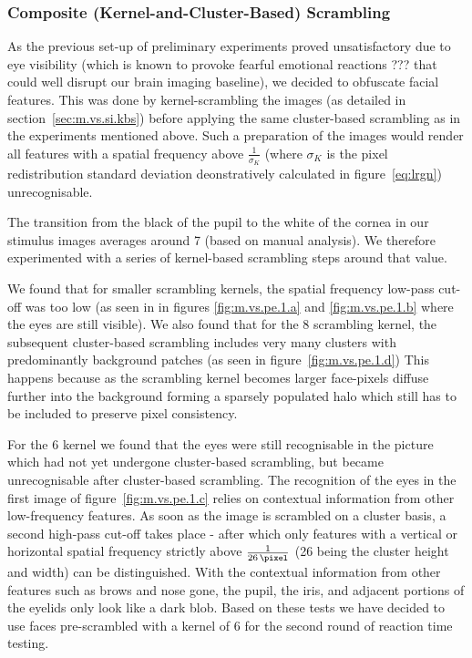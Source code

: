 	    \subsubsection{Composite (Kernel-and-Cluster-Based) Scrambling}
	    As the previous set-up of preliminary experiments proved unsatisfactory due to eye visibility (which is known to provoke fearful emotional reactions ??? that could well disrupt our brain imaging baseline), we decided to obfuscate facial features.
	    This was done by kernel-scrambling the images (as detailed in section~\ref{sec:m.vs.si.kbs}) before applying the same cluster-based scrambling as in the experiments mentioned above.
	    Such a preparation of the images would render all features with a spatial frequency above $\frac{1}{\sigma_{K}}$ (where $\sigma_{K}$ is the pixel redistribution standard deviation deonstratively calculated in figure~\ref{eq:lrgn}) unrecognisable.
	    
	    The transition from the black of the pupil to the white of the cornea in our stimulus images averages around \SI{7}{\pixel} (based on manual analysis).
	    We therefore experimented with a series of kernel-based scrambling steps around that value.
	    
	    We found that for smaller scrambling kernels, the spatial frequency low-pass cut-off was too low (as seen in in figures \ref{fig:m.vs.pe.1.a} and \ref{fig:m.vs.pe.1.b} where the eyes are still visible).
	    We also found that for the \SI{8}{\pixel} scrambling kernel, the subsequent cluster-based scrambling includes very many clusters with predominantly background patches (as seen in figure~\ref{fig:m.vs.pe.1.d})
	    This happens because as the scrambling kernel becomes larger face-pixels diffuse further into the background forming a sparsely populated halo which still has to be included to preserve pixel consistency.
	    
	    For the \SI{6}{\pixel} kernel we found that the eyes were still recognisable in the picture which had not yet undergone cluster-based scrambling, but became unrecognisable after cluster-based scrambling.
	    The recognition of the eyes in the first image of figure~\ref{fig:m.vs.pe.1.c} relies on contextual information from other low-frequency features.
	    As soon as the image is scrambled on a cluster basis, a second high-pass cut-off takes place - 
	    after which only features with a vertical or horizontal spatial frequency strictly above $\frac{1}{\SI{26}{\pixel}}$ (\SI{26}{\pixel} being the cluster height and width) can be distinguished.
	    With the contextual information from other features such as brows and nose gone, the pupil, the iris, and adjacent portions of the eyelids only look like a dark blob.
	    Based on these tests we have decided to use faces pre-scrambled with a kernel of \SI{6}{\pixel} for the second round of reaction time testing.
	    
